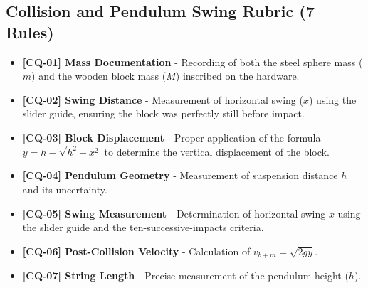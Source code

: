 \documentclass{article}
\begin{document}
\subsection*{Collision and Pendulum Swing Rubric (7 Rules)}
\begin{itemize}
\item \textbf{ [CQ-01] Mass Documentation } - Recording of both the steel sphere mass ($m$) and the wooden block mass ($M$) inscribed on the hardware.
\item \textbf{ [CQ-02] Swing Distance } - Measurement of horizontal swing ($x$) using the slider guide, ensuring the block was perfectly still before impact.
\item \textbf{ [CQ-03] Block Displacement } - Proper application of the formula $y = h - \sqrt{h^2 - x^2}$ to determine the vertical displacement of the block.
\item \textbf{ [CQ-04] Pendulum Geometry } - Measurement of suspension distance $h$ and its uncertainty.
\item \textbf{ [CQ-05] Swing Measurement } - Determination of horizontal swing $x$ using the slider guide and the ten-successive-impacts criteria.
\item \textbf{ [CQ-06] Post-Collision Velocity } - Calculation of $v_{b+m} = \sqrt{2gy}$.
\item \textbf{ [CQ-07] String Length } - Precise measurement of the pendulum height ($h$).
\end{itemize}
\end{document}
